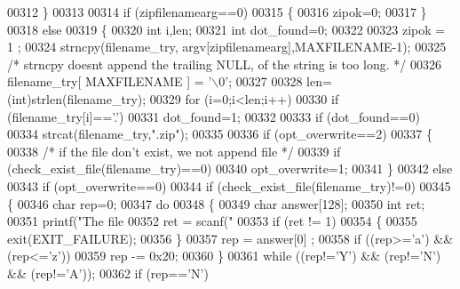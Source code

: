 \begin{DoxyCode}
{{{00312     \}
00313 
00314     \textcolor{keywordflow}{if} (zipfilenamearg==0)
00315     \{
00316         zipok=0;
00317     \}
00318     \textcolor{keywordflow}{else}
00319     \{
00320         \textcolor{keywordtype}{int} i,len;
00321         \textcolor{keywordtype}{int} dot\_found=0;
00322 
00323         zipok = 1 ;
00324         strncpy(filename\_try, argv[zipfilenamearg],MAXFILENAME-1);
00325         \textcolor{comment}{/* strncpy doesnt append the trailing NULL, of the string is too long. */}
00326         filename\_try[ MAXFILENAME ] = \textcolor{charliteral}{'\(\backslash\)0'};
00327 
00328         len=(int)strlen(filename\_try);
00329         \textcolor{keywordflow}{for} (i=0;i<len;i++)
00330             \textcolor{keywordflow}{if} (filename\_try[i]==\textcolor{charliteral}{'.'})
00331                 dot\_found=1;
00332 
00333         \textcolor{keywordflow}{if} (dot\_found==0)
00334             strcat(filename\_try,\textcolor{stringliteral}{".zip"});
00335 
00336         \textcolor{keywordflow}{if} (opt\_overwrite==2)
00337         \{
00338             \textcolor{comment}{/* if the file don't exist, we not append file */}
00339             \textcolor{keywordflow}{if} (check\_exist\_file(filename\_try)==0)
00340                 opt\_overwrite=1;
00341         \}
00342         \textcolor{keywordflow}{else}
00343         \textcolor{keywordflow}{if} (opt\_overwrite==0)
00344             \textcolor{keywordflow}{if} (check\_exist\_file(filename\_try)!=0)
00345             \{
00346                 \textcolor{keywordtype}{char} rep=0;
00347                 \textcolor{keywordflow}{do}
00348                 \{
00349                     \textcolor{keywordtype}{char} answer[128];
00350                     \textcolor{keywordtype}{int} ret;
00351                     printf(\textcolor{stringliteral}{"The file %
00352                     ret = scanf(\textcolor{stringliteral}{"%
00353                     \textcolor{keywordflow}{if} (ret != 1)
00354                     \{
00355                        exit(EXIT\_FAILURE);
00356                     \}
00357                     rep = answer[0] ;
00358                     \textcolor{keywordflow}{if} ((rep>=\textcolor{charliteral}{'a'}) && (rep<=\textcolor{charliteral}{'z'}))
00359                         rep -= 0x20;
00360                 \}
00361                 \textcolor{keywordflow}{while} ((rep!=\textcolor{charliteral}{'Y'}) && (rep!=\textcolor{charliteral}{'N'}) && (rep!=\textcolor{charliteral}{'A'}));
00362                 \textcolor{keywordflow}{if} (rep==\textcolor{charliteral}{'N'})
}}}}}
\end{DoxyCode}
